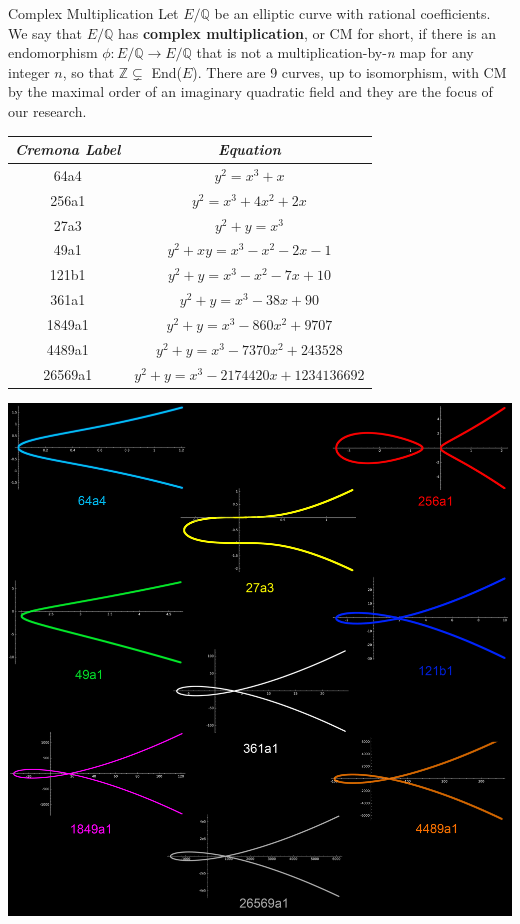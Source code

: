 \documentclass{beamer}
\newcommand{\Z}{\mathbb{Z}}
\newcommand{\Q}{\mathbb{Q}}
\begin{document}
\begin{frame}{}
\begin{columns}[t]
\begin{column}{0.245\linewidth}
\begin{block}{Complex Multiplication}
Let $E/\Q$ be an elliptic curve with rational coefficients. We say that $E/\Q$ has \textbf{complex multiplication}, or CM for short, if there is an endomorphism $\phi : E/\Q \rightarrow E/\Q$ that is not a multiplication-by-\textit{n} map for any integer $n$, so that $\Z \subsetneq$ End($E$). 
There are 9 curves, up to isomorphism, with CM by the maximal order of an imaginary quadratic field and they are the focus of our research. 
  \begin{center}
    \begin{tabular}{ | c | c | } \hline
    \emph{ Cremona Label} & \emph{Equation} \\ \hline
 64a4 & $y^2 = x^3 + x$ \\ \hline
256a1 &$y^2 = x^3 + 4x^2 + 2x$ \\ \hline 
27a3 & $y^2 + y = x^3$ \\ \hline
49a1&$y^2 + xy = x^3 - x^2 - 2x -1$ \\ \hline
121b1 &  $y^2 + y = x^3 - x^2 - 7x + 10$ \\ \hline
361a1 & $y^2 + y = x^3 - 38x + 90$ \\ \hline
1849a1 & $y^2 + y = x^3 - 860x^2 + 9707$ \\ \hline
4489a1 & $y^2 + y = x^3 - 7370x^2 + 243528$ \\ \hline
26569a1 & $y^2 + y = x^3 - 2174420x + 1234136692$ \\ \hline
    \end{tabular}
  \end{center}

\vspace{0.05em}

\begin{center}
\includegraphics[width=0.9\columnwidth]{curves}\\
\end{center}
\end{block}
\end{column}%



\end{columns}
\end{frame}
\end{document}
